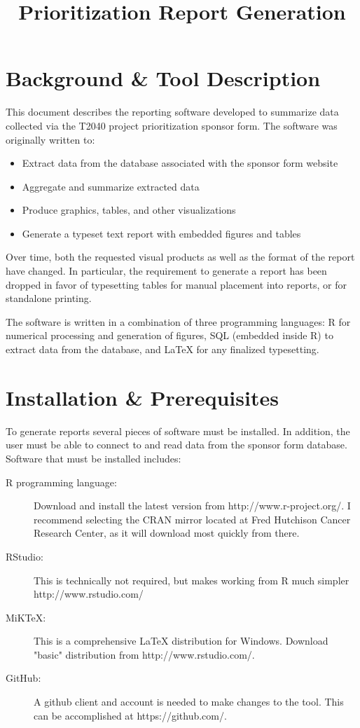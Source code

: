 \documentclass[10pt, letterpaper, final, twoside, onecolumn, article]{memoir}%
\title{Prioritization Report Generation}
\begin{document}
\maketitle




\chapter{Background \& Tool Description}
This document describes the reporting software developed to summarize data collected via the T2040 project prioritization sponsor form. The software was originally written to:
\begin{itemize}
\item Extract data from the database associated with the sponsor form website
\item Aggregate and summarize extracted data
\item Produce graphics, tables, and other visualizations
\item Generate a typeset text report with embedded figures and tables
\end{itemize}

Over time, both the requested visual products as well as the format of the report have changed. In particular, the requirement to generate a report has been dropped in favor of typesetting tables for manual placement into reports, or for standalone printing.

The software is written in a combination of three programming languages: R for numerical processing and generation of figures, SQL (embedded inside R) to extract data from the database, and LaTeX for any finalized typesetting.

\chapter{Installation \& Prerequisites}
To generate reports several pieces of software must be installed. In addition, the user must be able to connect to and read data from the sponsor form database. Software that must be installed includes:
\begin{description}
\item[R programming language:] Download and install the latest version from http://www.r-project.org/. I recommend selecting the CRAN mirror located at Fred Hutchison Cancer Research Center, as it will download most quickly from there.
\item[RStudio:] This is technically not required, but makes working from R much simpler http://www.rstudio.com/
\item[MiKTeX:] This is a comprehensive LaTeX distribution for Windows. Download "basic" distribution from http://www.rstudio.com/.
\item[GitHub:] A github client and account is needed to make changes to the tool. This can be accomplished at https://github.com/.
\end{description}
\end{document}
